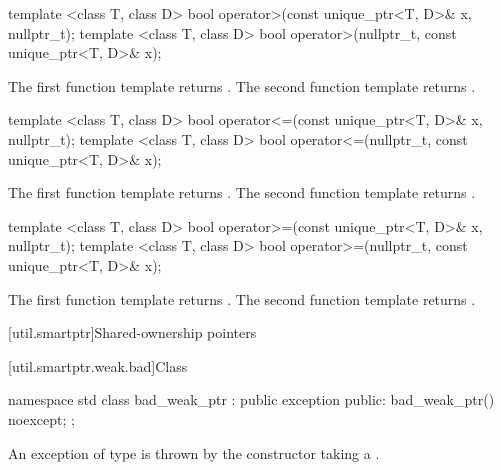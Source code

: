 %
\begin{itemdecl}
template <class T, class D>
  bool operator>(const unique_ptr<T, D>& x, nullptr_t);
template <class T, class D>
  bool operator>(nullptr_t, const unique_ptr<T, D>& x);
\end{itemdecl}

\begin{itemdescr}
\pnum
\returns
The first function template returns .
The second function template returns .
\end{itemdescr}

%
\begin{itemdecl}
template <class T, class D>
  bool operator<=(const unique_ptr<T, D>& x, nullptr_t);
template <class T, class D>
  bool operator<=(nullptr_t, const unique_ptr<T, D>& x);
\end{itemdecl}

\begin{itemdescr}
\pnum
\returns
The first function template returns .
The second function template returns .
\end{itemdescr}

%
\begin{itemdecl}
template <class T, class D>
  bool operator>=(const unique_ptr<T, D>& x, nullptr_t);
template <class T, class D>
  bool operator>=(nullptr_t, const unique_ptr<T, D>& x);
\end{itemdecl}

\begin{itemdescr}
\pnum
\returns
The first function template returns .
The second function template returns .
\end{itemdescr}

%
[util.smartptr]{Shared-ownership pointers}

[util.smartptr.weak.bad]{Class }
%
\begin{codeblock}
namespace std {
  class bad_weak_ptr : public exception {
  public:
    bad_weak_ptr() noexcept;
  };
}
\end{codeblock}

\pnum
An exception of type  is thrown by the 
constructor taking a .

